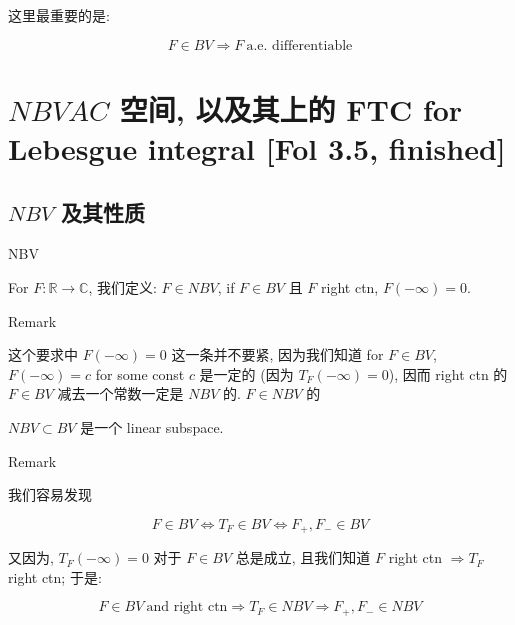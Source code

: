 \documentclass{qlnotes-export}
\begin{document}
这里最重要的是:

\[F \in BV\Longrightarrow F\ \text{a.e. differentiable}\]

\section{\texorpdfstring{\(NBV AC\) 空间, 以及其上的 FTC for Lebesgue integral {[}Fol 3.5, finished{]}}{NBV AC 空间, 以及其上的 FTC for Lebesgue integral {[}Fol 3.5, finished{]}}}

\subsection{\texorpdfstring{\(NBV\) 及其性质}{NBV 及其性质}}\label{nbv-ux53caux5176ux6027ux8d28}

\begin{definition}{NBV}\label{def-12-differentiation-on-real-spaces-nbv}

For \(F:{\mathbb{R}}\rightarrow{\mathbb{C}}\), 我们定义: \(F \in NBV\), if \(F \in BV\) 且 \(F\) right ctn, \(F( - \infty) = 0\).

\end{definition}

\begin{qlremark}{Remark}

这个要求中 \(F( - \infty) = 0\) 这一条并不要紧, 因为我们知道 for \(F \in BV\), \(F( - \infty) = c\) for some const \(c\) 是一定的 (因为 \(T_{F}( - \infty) = 0\)), 因而 right ctn 的 \(F \in BV\) 减去一个常数一定是 \(NBV\) 的. \(F \in NBV\) 的

\end{qlremark}

\begin{proposition}\label{prop-12-differentiation-on-real-spaces-proposition-004}

\(NBV \subset BV\) 是一个 linear subspace.

\end{proposition}

\begin{qlremark}{Remark}

我们容易发现

\[F \in BV\Leftrightarrow T_{F} \in BV\Leftrightarrow F_{+},F_{-} \in BV\]

又因为, \(T_{F}( - \infty) = 0\) 对于 \(F \in BV\) 总是成立, 且我们知道 \(F\) right ctn \(\Longrightarrow T_{F}\) right ctn; 于是:

\[F \in BV\ \text{and right ctn}\Longrightarrow T_{F} \in NBV\Longrightarrow F_{+},F_{-} \in NBV\]

\end{qlremark}
\end{document}

